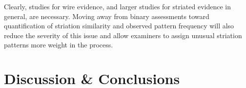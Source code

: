 \documentclass[9pt,twocolumn,twoside]{pnas-new}\usepackage[]{graphicx}\usepackage[dvipsnames]{xcolor}
\newcommand{\svp}[1]{{\textcolor{RedOrange}{#1}}}
\newcommand{\hh}[1]{{\textcolor{ForestGreen}{#1}}}
\begin{document}
\svp{Clearly, studies for wire evidence, and larger studies for striated evidence in general, are necessary.}
\svp{Moving away from binary assessments toward quantification of striation similarity and observed pattern frequency will also reduce the severity of this issue and allow examiners to assign unusual striation patterns more weight in the process.}






\begin{table}
\caption{\label{tab:family-wise}Table showing the relationship between false positive rates and the chance of false identifications in $N$ comparisons for a set of different FPRs and different number of comparisons. The last column gives the number of comparisons allowed while ensuring a false identification percentage of at most 10\%.}
\end{table}

\section*{Discussion \& Conclusions}
\end{document}
